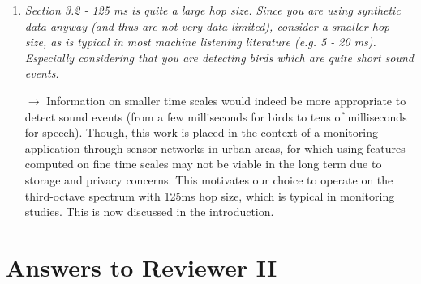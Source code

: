 \documentclass[10pt]{article}
\begin{document}
\begin{enumerate}
\item \emph{Section 3.2 - 125 ms is quite a large hop size. Since you are using synthetic data anyway (and thus are not very data limited), consider a smaller hop size, as is typical in most machine listening literature (e.g. 5 - 20 ms). Especially considering that you are detecting birds which are quite short sound events.}

$\rightarrow$ Information on smaller time scales would indeed be more appropriate to detect sound events (from a few milliseconds for birds to tens of milliseconds for speech). Though, this work is placed in the context of a monitoring application through sensor networks in urban areas, for which using features computed on fine time scales may not be viable in the long term due to storage and privacy concerns. This motivates our choice to operate on the third-octave spectrum with 125ms hop size, which is typical in monitoring studies. This is now discussed in the introduction.

\end{enumerate}

\section{Answers to Reviewer II}
\end{document}
